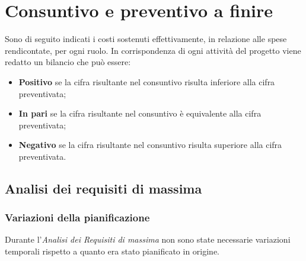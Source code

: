 \section{Consuntivo e preventivo a finire}
\label{sec:consuntivo}
Sono di seguito indicati i costi sostenuti effettivamente, in relazione alle spese rendicontate, per ogni ruolo.
In corrispondenza di ogni attività del progetto viene redatto un bilancio che può essere:
\begin{itemize}
	\item \textbf{Positivo} se la cifra risultante nel consuntivo risulta inferiore alla cifra preventivata;
	\item \textbf{In pari} se la cifra risultante nel consuntivo è equivalente alla cifra preventivata;	
	\item \textbf{Negativo} se la cifra risultante nel consuntivo risulta superiore alla cifra preventivata.
\end{itemize}
	\subsection{Analisi dei requisiti di massima}
		\subsubsection{Variazioni della pianificazione}
		Durante l'\textit{Analisi dei Requisiti di massima} non sono state necessarie variazioni temporali rispetto a quanto era stato pianificato in origine.
